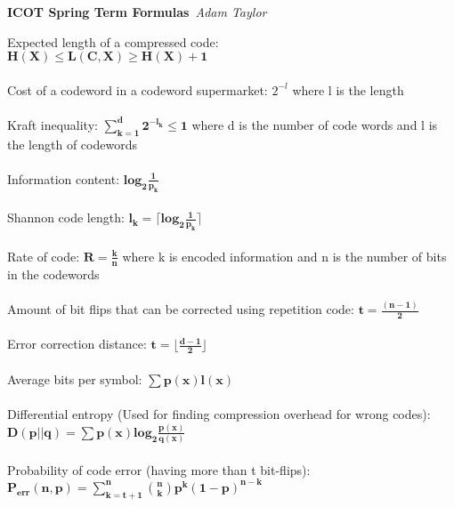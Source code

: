 \documentclass{article}
\begin{document}
\begin{center}
\Large\textbf{ICOT Spring Term Formulas}\
\large\textit{Adam Taylor}
\newline
\end{center}
Expected length of a compressed code: \\
$\mathbf{H(X) \leq L(C,X)\geq H(X)+1}$\\\\
Cost of a codeword in a codeword supermarket: $2^{-l}$ where l is the length \\\\
Kraft inequality: $\mathbf{\sum\limits_{k=1}^{d}2^{{-l_k}}\leq1}$ where d is the number of code words and l is the length of codewords\\\\
Information content: $\mathbf{log_2\frac{1}{p_k}}$\\\\
Shannon code length: $\mathbf {l_k = \lceil log_2\frac{1}{p_k}\rceil }$\\\\
Rate of code: $\mathbf{R=\frac{k}{n}}$ where k is encoded information and n is the number of bits in the codewords\\\\
Amount of bit flips that can be corrected using repetition code: $\mathbf{t = \frac{(n-1)}{2}}$\\\\
Error correction distance: $\mathbf{t=\lfloor\frac{d-1}{2}\rfloor}$\\\\
Average bits per symbol: $\mathbf{\sum p(x)l(x)}$\\\\
Differential entropy (Used for finding compression overhead for wrong codes):$\mathbf{D(p||q)=\sum p(x)log_2\frac{p(x)}{q(x)}}$\\\\
Probability of code error (having more than t bit-flips):\\ $\mathbf{P_{err}(n,p) = \sum\limits_{k=t+1}^{n}{n\choose k}p^k(1-p)^{n-k}}$\\\\
\end{document}
